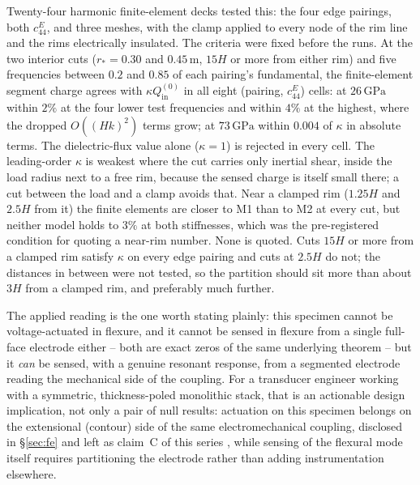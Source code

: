 \documentclass[11pt]{article}
\begin{document}
Twenty-four harmonic finite-element decks tested this: the four edge
pairings, both $c_{44}^E$, and three meshes, with the clamp applied to
every node of the rim line and the rims electrically insulated. The
criteria were fixed before the runs. At the two interior cuts
($r_*=0.30$ and $0.45\,\mathrm m$, $15H$ or more from either rim) and
five frequencies between $0.2$ and $0.85$ of each pairing's fundamental,
the finite-element segment charge agrees with $\kappa Q_{\mathrm{in}}^{(0)}$
in all eight (pairing, $c_{44}^E$) cells: at $26\,\mathrm{GPa}$ within
$2\%$ at the four lower test frequencies and within $4\%$ at the
highest, where the dropped $O((Hk)^2)$ terms grow; at $73\,\mathrm{GPa}$
within $0.004$ of $\kappa$ in absolute terms. The dielectric-flux value alone
($\kappa=1$) is rejected in every cell. The leading-order $\kappa$ is
weakest where the cut carries only inertial shear, inside the load
radius next to a free rim, because the sensed charge is itself small
there; a cut between the load and a clamp avoids that. Near a clamped
rim ($1.25H$ and $2.5H$ from it) the finite elements are closer to M1
than to M2 at every cut, but neither model holds to $3\%$ at both
stiffnesses, which was the pre-registered condition for quoting a
near-rim number. None is quoted. Cuts $15H$ or more from a clamped rim
satisfy $\kappa$ on every edge pairing and cuts at $2.5H$ do not; the
distances in between were not tested, so the partition should sit more
than about $3H$ from a clamped rim, and preferably much further.

The applied reading is the one worth stating plainly: this specimen
cannot be voltage-actuated in flexure, and it cannot be sensed in flexure
from a single full-face electrode either -- both are exact zeros of the
same underlying theorem -- but it \emph{can} be sensed, with a genuine
resonant response, from a segmented electrode reading the mechanical
side of the coupling. For a transducer engineer working with a
symmetric, thickness-poled monolithic stack, that is an actionable design
implication, not only a pair of null results: actuation on this specimen
belongs on the extensional (contour) side of the same electromechanical
coupling, disclosed in \S\ref{sec:fe} and left as claim~C of this series
\cite{mccune2026piezo}, while sensing of the flexural mode itself
requires partitioning the electrode rather than adding instrumentation
elsewhere.
\end{document}
